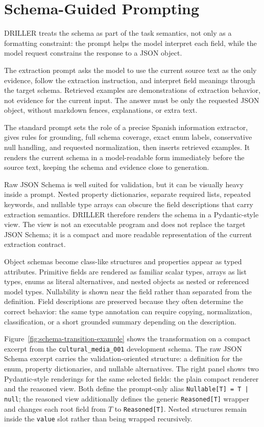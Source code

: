 \section{Schema-Guided Prompting}

DRILLER treats the schema as part of the task semantics, not only as a formatting constraint: the prompt helps the model interpret each field, while the model request constrains the response to a JSON object.

The extraction prompt asks the model to use the current source text as the only evidence, follow the extraction instruction, and interpret field meanings through the target schema. Retrieved examples are demonstrations of extraction behavior, not evidence for the current input. The answer must be only the requested JSON object, without markdown fences, explanations, or extra text.

The standard prompt sets the role of a precise Spanish information extractor, gives rules for grounding, full schema coverage, exact enum labels, conservative null handling, and requested normalization, then inserts retrieved examples. It renders the current schema in a model-readable form immediately before the source text, keeping the schema and evidence close to generation.

Raw JSON Schema is well suited for validation, but it can be visually heavy inside a prompt. Nested property dictionaries, separate required lists, repeated keywords, and nullable type arrays can obscure the field descriptions that carry extraction semantics. DRILLER therefore renders the schema in a Pydantic-style view. The view is not an executable program and does not replace the target JSON Schema; it is a compact and more readable representation of the current extraction contract.

Object schemas become class-like structures and properties appear as typed attributes. Primitive fields are rendered as familiar scalar types, arrays as list types, enums as literal alternatives, and nested objects as nested or referenced model types. Nullability is shown near the field rather than separated from the definition. Field descriptions are preserved because they often determine the correct behavior: the same type annotation can require copying, normalization, classification, or a short grounded summary depending on the description.

Figure~\ref{fig:schema-transition-example} shows the transformation on a compact excerpt from the \texttt{cultural\_media\_001} development schema. The raw JSON Schema excerpt carries the validation-oriented structure: a definition for the enum, property dictionaries, and nullable alternatives. The right panel shows two Pydantic-style renderings for the same selected fields: the plain compact renderer and the reasoned view. Both define the prompt-only alias \texttt{Nullable[T] = T | null}; the reasoned view additionally defines the generic \texttt{Reasoned[T]} wrapper and changes each root field from \(T\) to \texttt{Reasoned[T]}. Nested structures remain inside the \texttt{value} slot rather than being wrapped recursively.

